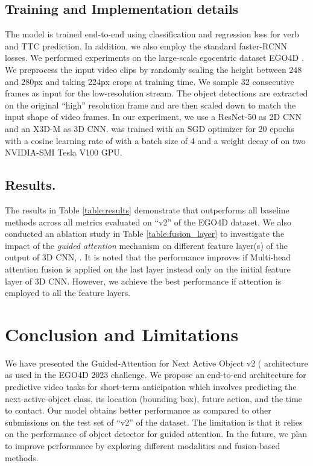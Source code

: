 \documentclass[10pt,twocolumn,letterpaper]{article}
\begin{document}
\subsection{Training and Implementation details} 
The model is trained end-to-end using classification and regression loss for verb and TTC prediction. In addition, we also employ the standard faster-RCNN losses. We performed experiments on the large-scale egocentric dataset EGO4D \cite{ego4d}. 
We preprocess the input video clips by randomly scaling the height between 248 and 280px and taking 224px crops at training time. We sample 32 consecutive frames as input for the low-resolution stream. The object detections are extracted on the original ``high'' resolution frame and are then scaled down to match the input shape of video frames. In our experiment, we use a ResNet-50 as 2D CNN and an X3D-M as 3D CNN.  was trained with an SGD optimizer for 20 epochs with a cosine learning rate of  with a batch size of 4 and a weight decay of  on two NVIDIA-SMI Tesla V100 GPU.

\noindent
\subsection{Results.}
 The results in Table \ref{table:results} demonstrate that  outperforms all baseline methods across all metrics evaluated on ``v2'' of the EGO4D dataset. We also conducted an ablation study in Table \ref{table:fusion_layer} to investigate the impact of the \emph{guided attention} mechanism on different feature layer(s) of the output of 3D CNN, . It is noted that the performance improves if Multi-head attention fusion is applied on the last layer instead only on the initial feature layer of 3D CNN. However, we achieve the best performance if attention is employed to all the feature layers. 

\section{Conclusion and Limitations}
\label{sec:conclusion}
We have presented the Guided-Attention for Next Active Object v2 ( architecture as used in the EGO4D 2023 challenge. We propose an end-to-end architecture for predictive video tasks for short-term anticipation which involves predicting the next-active-object class, its location (bounding box), future action, and the time to contact. Our model obtains better performance as compared to other submissions on the test set of ``v2'' of the dataset. The limitation is that it relies on the performance of object detector for guided attention. In the future, we plan to improve performance by exploring different modalities and fusion-based methods.

\newpage


\end{document}
